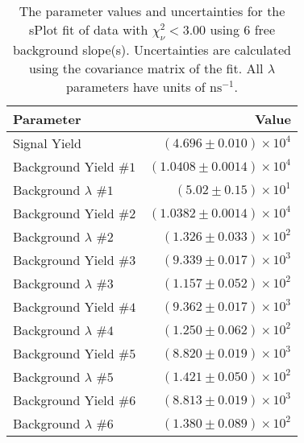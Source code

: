 
\begin{table}
    \begin{center}
        \begin{tabular}{lr}\toprule
            Parameter & Value \\\midrule
            Signal Yield & $(4.696 \pm 0.010) \times 10^{4}$ \\
            Background Yield $\#1$ & $(1.0408 \pm 0.0014) \times 10^{4}$ \\
            Background $\lambda$ $\#1$ & $(5.02 \pm 0.15) \times 10^{1}$ \\
            Background Yield $\#2$ & $(1.0382 \pm 0.0014) \times 10^{4}$ \\
            Background $\lambda$ $\#2$ & $(1.326 \pm 0.033) \times 10^{2}$ \\
            Background Yield $\#3$ & $(9.339 \pm 0.017) \times 10^{3}$ \\
            Background $\lambda$ $\#3$ & $(1.157 \pm 0.052) \times 10^{2}$ \\
            Background Yield $\#4$ & $(9.362 \pm 0.017) \times 10^{3}$ \\
            Background $\lambda$ $\#4$ & $(1.250 \pm 0.062) \times 10^{2}$ \\
            Background Yield $\#5$ & $(8.820 \pm 0.019) \times 10^{3}$ \\
            Background $\lambda$ $\#5$ & $(1.421 \pm 0.050) \times 10^{2}$ \\
            Background Yield $\#6$ & $(8.813 \pm 0.019) \times 10^{3}$ \\
            Background $\lambda$ $\#6$ & $(1.380 \pm 0.089) \times 10^{2}$ \\\bottomrule
        \end{tabular}
        \caption{The parameter values and uncertainties for the sPlot fit of data with $\chi^2_\nu < 3.00$ using 6 free background slope(s). Uncertainties are calculated using the covariance matrix of the fit. All $\lambda$ parameters have units of $\si{\nano\second}^{-1}$.}
    \end{center}
\end{table}
